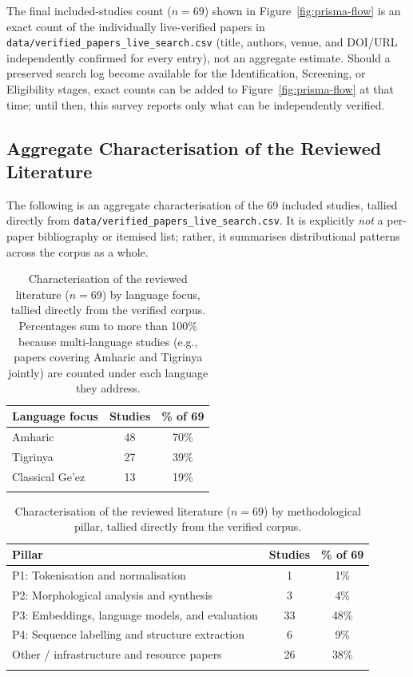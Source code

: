 \documentclass[sn-mathphys-num]{sn-jnl}
\theoremstyle{thmstyleone}
\theoremstyle{thmstyletwo}
\theoremstyle{thmstylethree}
\begin{document}
\noindent The final included-studies count ($n=69$) shown in Figure~\ref{fig:prisma-flow} is an exact count of the individually live-verified papers in \texttt{data/verified\_papers\_live\_search.csv} (title, authors, venue, and DOI/URL independently confirmed for every entry), not an aggregate estimate. Should a preserved search log become available for the Identification, Screening, or Eligibility stages, exact counts can be added to Figure~\ref{fig:prisma-flow} at that time; until then, this survey reports only what can be independently verified.

\subsection{Aggregate Characterisation of the Reviewed Literature}\label{sec:prisma-characterisation}

The following is an aggregate characterisation of the 69 included studies, tallied directly from \texttt{data/verified\_papers\_live\_search.csv}. It is explicitly \emph{not} a per-paper bibliography or itemised list; rather, it summarises distributional patterns across the corpus as a whole.

\begin{table}[h]
\caption{Characterisation of the reviewed literature ($n=69$) by language focus, tallied directly from the verified corpus. Percentages sum to more than 100\% because multi-language studies (e.g., papers covering Amharic and Tigrinya jointly) are counted under each language they address.}\label{table:lit-by-language}
\begin{tabular}{@{}lcc@{}}
\toprule
\textbf{Language focus} & \textbf{Studies} & \textbf{\% of 69} \\
\midrule
Amharic & 48 & 70\% \\
Tigrinya & 27 & 39\% \\
Classical Ge'ez & 13 & 19\% \\
\botrule
\end{tabular}
\end{table}

\begin{table}[h]
\caption{Characterisation of the reviewed literature ($n=69$) by methodological pillar, tallied directly from the verified corpus.}\label{table:lit-by-pillar}
\begin{tabular}{@{}lcc@{}}
\toprule
\textbf{Pillar} & \textbf{Studies} & \textbf{\% of 69} \\
\midrule
P1: Tokenisation and normalisation & 1 & 1\% \\
P2: Morphological analysis and synthesis & 3 & 4\% \\
P3: Embeddings, language models, and evaluation & 33 & 48\% \\
P4: Sequence labelling and structure extraction & 6 & 9\% \\
Other / infrastructure and resource papers & 26 & 38\% \\
\botrule
\end{tabular}
\end{table}
\end{document}
